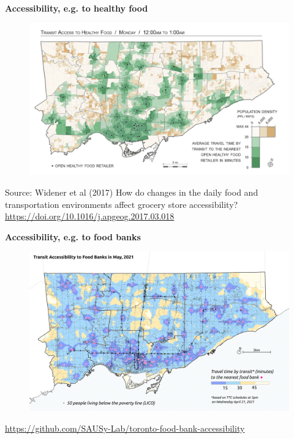 \documentclass[aspectratio=169]{beamer}
\begin{document}

\begin{frame}
	
	\textbf{Accessibility, e.g. to healthy food}
	
	\begin{figure}
		\centering
		\includegraphics[width=0.94\linewidth]{images/food_midnight.png}
	\end{figure}
	
	\tiny Source: Widener et al (2017) How do changes in the daily food and transportation environments affect grocery store accessibility?
	\url{https://doi.org/10.1016/j.apgeog.2017.03.018}
	
\end{frame}




\begin{frame}
	
	\textbf{Accessibility, e.g. to food banks}
	
	\begin{figure}
		\centering
		\includegraphics[width=0.94\linewidth]{images/foodbanks_access.png}
	\end{figure}
	
	\tiny 
	\url{https://github.com/SAUSy-Lab/toronto-food-bank-accessibility}
	
\end{frame}
\end{document}
